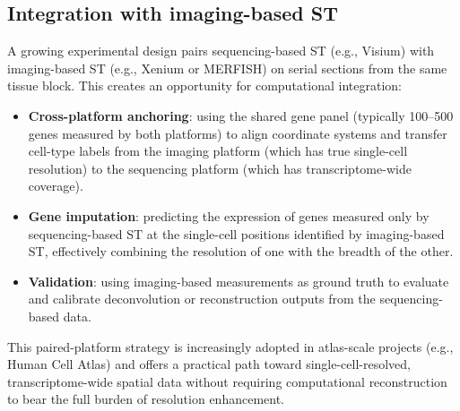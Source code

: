 \subsection{Integration with imaging-based ST}

A growing experimental design pairs sequencing-based ST (e.g., Visium) with imaging-based ST (e.g., Xenium or MERFISH) on serial sections from the same tissue block. This creates an opportunity for computational integration:

\begin{itemize}
  \item \textbf{Cross-platform anchoring}: using the shared gene panel (typically 100--500 genes measured by both platforms) to align coordinate systems and transfer cell-type labels from the imaging platform (which has true single-cell resolution) to the sequencing platform (which has transcriptome-wide coverage).
  \item \textbf{Gene imputation}: predicting the expression of genes measured only by sequencing-based ST at the single-cell positions identified by imaging-based ST, effectively combining the resolution of one with the breadth of the other.
  \item \textbf{Validation}: using imaging-based measurements as ground truth to evaluate and calibrate deconvolution or reconstruction outputs from the sequencing-based data.
\end{itemize}

This paired-platform strategy is increasingly adopted in atlas-scale projects (e.g., Human Cell Atlas) and offers a practical path toward single-cell-resolved, transcriptome-wide spatial data without requiring computational reconstruction to bear the full burden of resolution enhancement.
